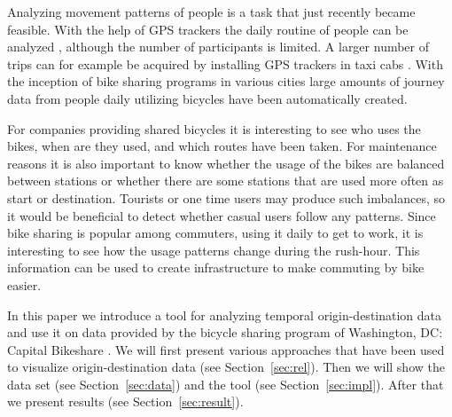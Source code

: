 Analyzing movement patterns of people is a task that just recently became
feasible. With the help of GPS trackers the daily routine of people can
be analyzed \cite{geo1, geo2, geo3}, although the number of participants
is limited. A larger number of trips can for example be acquired
by installing GPS trackers in taxi cabs \cite{Ferreira2013, Guo2012}.
With the inception of bike sharing programs in various cities large
amounts of journey data from people daily utilizing bicycles have
been automatically created.

For companies providing shared bicycles it is interesting to see who
uses the bikes, when are they used, and which routes have been taken.
For maintenance reasons it is also important to know whether the usage
of the bikes are balanced between stations or whether there are some
stations that are used more often as start or destination.
Tourists or one time users may produce such imbalances, so it
would be beneficial to detect whether casual users follow any patterns.
Since bike sharing is popular among commuters, using it daily to get
to work, it is interesting to see how the usage patterns change during
the rush-hour. This information can be used to create infrastructure
to make commuting by bike easier.

In this paper we introduce a tool for analyzing temporal
origin-destination data and use it on data provided by
the bicycle sharing program
of Washington, DC: Capital Bikeshare \cite{wash}.
We will first present various approaches that have been used
to visualize origin-destination data (see Section~\ref{sec:rel}).
Then we will show the data set (see Section~\ref{sec:data}) and
the tool (see Section~\ref{sec:impl}).
After that we present results (see Section~\ref{sec:result}).
